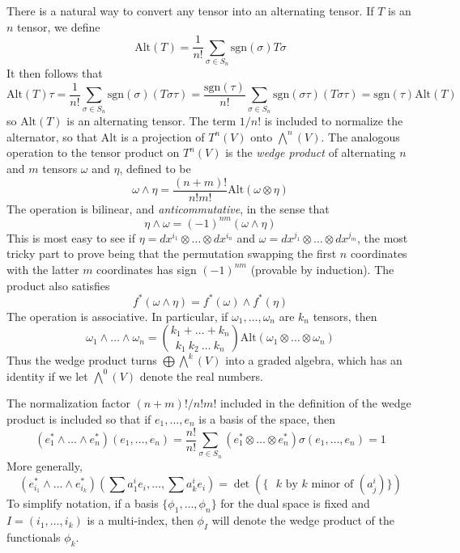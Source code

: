 There is a natural way to convert any tensor into an alternating tensor. If $T$ is an $n$ tensor, we define
%
\[ \text{Alt}(T) = \frac{1}{n!} \sum_{\sigma \in S_n} \text{sgn}(\sigma) T \sigma \]
%
It then follows that
%
\[ \text{Alt}(T) \tau = \frac{1}{n!} \sum_{\sigma \in S_n} \text{sgn}(\sigma) (T \sigma \tau) = \frac{\text{sgn}(\tau)}{n!} \sum_{\sigma \in S_n} \text{sgn}(\sigma \tau) (T \sigma \tau) = \text{sgn}(\tau) \text{Alt}(T) \]
%
so $\text{Alt}(T)$ is an alternating tensor. The term $1/n!$ is included to normalize the alternator, so that $\text{Alt}$ is a projection of $T^n(V)$ onto $\bigwedge^n(V)$. The analogous operation to the tensor product on $T^n(V)$ is the {\it wedge product} of alternating $n$ and $m$ tensors $\omega$ and $\eta$, defined to be
%
\[ \omega \wedge \eta = \frac{(n + m)!}{n! m!} \text{Alt}(\omega \otimes \eta) \]
%
The operation is bilinear, and {\it anticommutative}, in the sense that
%
\[ \eta \wedge \omega = (-1)^{nm} (\omega \wedge \eta) \]
%
This is most easy to see if $\eta = dx^{i_1} \otimes \dots \otimes dx^{i_n}$ and $\omega = dx^{j_1} \otimes \dots \otimes dx^{j_m}$, the most tricky part to prove being that the permutation swapping the first $n$ coordinates with the latter $m$ coordinates has sign $(-1)^{nm}$ (provable by induction). The product also satisfies
%
\[ f^*(\omega \wedge \eta) = f^*(\omega) \wedge f^*(\eta) \]
%
The operation is associative. In particular, if $\omega_1, \dots, \omega_n$ are $k_n$ tensors, then
%
\[ \omega_1 \wedge \dots \wedge \omega_n = {k_1 + \dots + k_n \choose k_1\ k_2\ \dots\ k_n} \text{Alt}(\omega_1 \otimes \dots \otimes \omega_n) \]
%
Thus the wedge product turns $\bigoplus \bigwedge^k(V)$ into a graded algebra, which has an identity if we let $\bigwedge^0(V)$ denote the real numbers.

The normalization factor $(n+m)!/n!m!$ included in the definition of the wedge product is included so that if $e_1, \dots, e_n$ is a basis of the space, then
%
\[ (e_1^* \wedge \dots \wedge e_n^*)(e_1, \dots, e_n) = \frac{n!}{n!} \sum_{\sigma\in S_n} (e_1^* \otimes \dots \otimes e_n^*) \sigma (e_1, \dots, e_n) = 1 \]
%
More generally,
%
\[ (e_{i_1}^* \wedge \dots \wedge e_{i_k}^*) \left( \sum a^i_1e_i, \dots, \sum a^i_ke_i \right) = \det \left( \{ \text{ $k$ by $k$ minor of $(a^i_j)$} \} \right) \]
%
To simplify notation, if a basis $\{ \phi_1, \dots, \phi_n \}$ for the dual space is fixed and $I = (i_1, \dots, i_k)$ is a multi-index, then $\phi_I$ will denote the wedge product of the functionals $\phi_k$.

